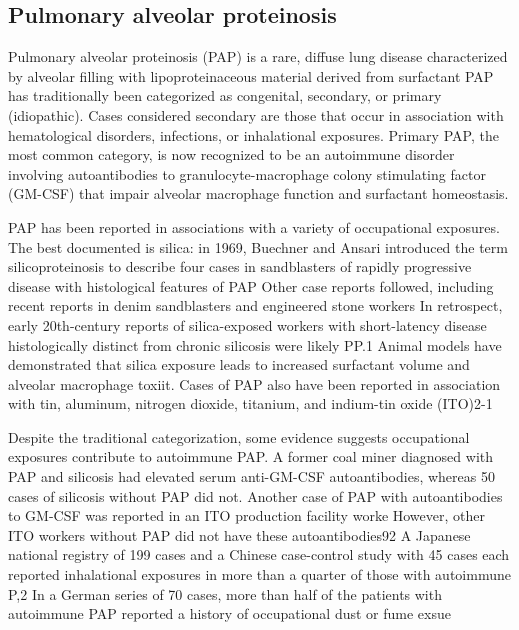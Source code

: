 \documentclass[a4
er,12pt]{article}
\begin{document}
\subsection{Pulmonary alveolar proteinosis}
Pulmonary alveolar proteinosis (PAP) is a rare, diffuse lung disease characterized by alveolar filling with lipoproteinaceous material derived from surfactant  PAP has traditionally been categorized as congenital, secondary, or primary (idiopathic).  Cases considered secondary are those that occur in association with hematological disorders, infections, or inhalational exposures.  Primary PAP, the most common category, is now recognized to be an autoimmune disorder involving autoantibodies
to granulocyte-macrophage colony stimulating factor (GM-CSF) that impair alveolar macrophage function and surfactant homeostasis.

PAP has been reported in associations with a variety of occupational exposures.  The best documented is silica: in 1969, Buechner and Ansari introduced the term silicoproteinosis to describe four cases in sandblasters of rapidly progressive disease with histological features of PAP  Other case reports followed, including recent reports in denim sandblasters and engineered stone workers  In retrospect, early 20th-century reports of silica-exposed workers with short-latency disease
histologically distinct from chronic silicosis were likely PP.1  Animal models have demonstrated that silica exposure leads to increased surfactant volume and alveolar macrophage toxiit.  Cases of PAP also have been reported in association with tin, aluminum, nitrogen dioxide, titanium, and indium-tin oxide (ITO)2-1

Despite the traditional categorization, some evidence suggests occupational exposures contribute to autoimmune PAP.  A former coal miner diagnosed with PAP and silicosis had elevated serum anti-GM-CSF autoantibodies, whereas 50 cases of silicosis without PAP did not.  Another case of PAP with autoantibodies to GM-CSF was reported in an ITO production facility worke  However, other ITO workers without PAP did not have these autoantibodies92  A Japanese national registry of 199
cases and a Chinese case-control study with 45 cases each reported inhalational exposures in more than a quarter of those with autoimmune P,2  In a German series of 70 cases, more than half of the patients with autoimmune PAP reported a history of occupational dust or fume exsue  
\end{document}
